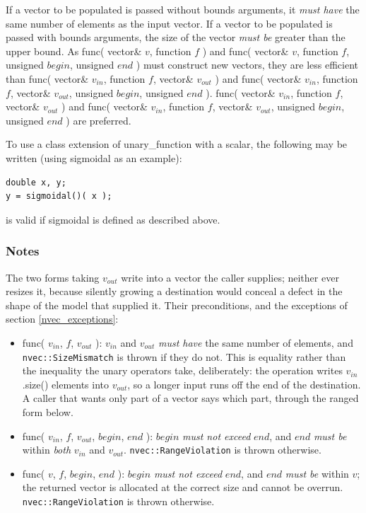 \documentclass{report}
\begin{document}
If a vector to be populated is passed without bounds arguments, it
{\em must have} the same number of elements as the input vector.  If a
vector to be populated is passed with bounds arguments, the size of
the vector {\em must be} greater than the upper bound.  As func(
vector\& $v$, function $f$ ) and func( vector\& $v$, function $f$,
unsigned $begin$, unsigned $end$ ) must construct new vectors, they
are less efficient than func( vector\& $v_{in}$, function $f$,
vector\& $v_{out}$ ) and func( vector\& $v_{in}$, function $f$,
vector\& $v_{out}$, unsigned $begin$, unsigned $end$ ).  func(
vector\& $v_{in}$, function $f$, vector\& $v_{out}$ ) and func(
vector\& $v_{in}$, function $f$, vector\& $v_{out}$, unsigned $begin$,
unsigned $end$ ) are preferred.

To use a class extension of unary\_function with a scalar, the
following may be written (using sigmoidal as an example):

\begin{verbatim}
double x, y;
y = sigmoidal()( x );
\end{verbatim}

is valid if sigmoidal is defined as described above.

\subsubsection{Notes}
The two forms taking $v_{out}$ write into a vector the caller supplies;
neither ever resizes it, because silently growing a destination would
conceal a defect in the shape of the model that supplied it.  Their
preconditions, and the exceptions of section \ref{nvec_exceptions}:

\begin{itemize}
\item func( $v_{in}$, $f$, $v_{out}$ ): $v_{in}$ and $v_{out}$ {\em
	must have} the same number of elements, and
	\texttt{nvec::SizeMismatch} is thrown if they do not.  This is
	equality rather than the inequality the unary operators take,
	deliberately: the operation writes $v_{in}$.size() elements into
	$v_{out}$, so a longer input runs off the end of the
	destination.  A caller that wants only part of a vector says
	which part, through the ranged form below.
\item func( $v_{in}$, $f$, $v_{out}$, $begin$, $end$ ): $begin$ {\em
	must not exceed} $end$, and $end$ {\em must be} within {\em
	both} $v_{in}$ and $v_{out}$.  \texttt{nvec::RangeViolation}
	is thrown otherwise.
\item func( $v$, $f$, $begin$, $end$ ): $begin$ {\em must not exceed}
	$end$, and $end$ {\em must be} within $v$; the returned vector
	is allocated at the correct size and cannot be overrun.
	\texttt{nvec::RangeViolation} is thrown otherwise.
\end{itemize}
\end{document}
